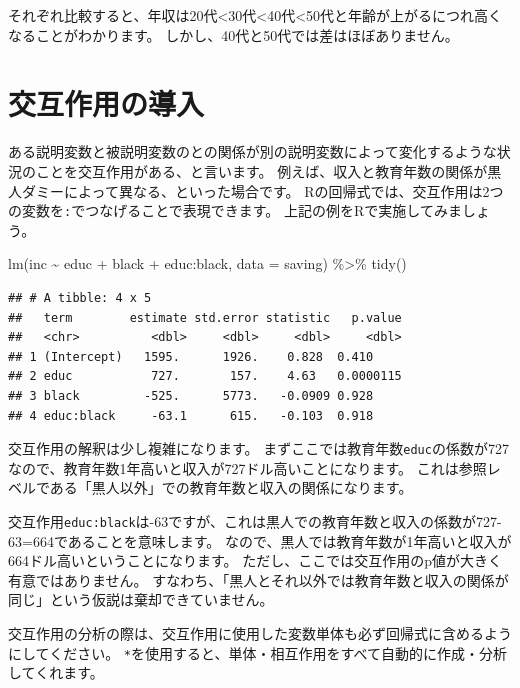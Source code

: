 \documentclass[
]{book}
\newenvironment{Shaded}{\begin{snugshade}}{\end{snugshade}}
\newcommand{\AttributeTok}[1]{\textcolor[rgb]{0.77,0.63,0.00}{#1}}
\newcommand{\FunctionTok}[1]{\textcolor[rgb]{0.00,0.00,0.00}{#1}}
\newcommand{\NormalTok}[1]{#1}
\newcommand{\SpecialCharTok}[1]{\textcolor[rgb]{0.00,0.00,0.00}{#1}}
\begin{document}
それぞれ比較すると、年収は20代\textless30代\textless40代\textless50代と年齢が上がるにつれ高くなることがわかります。
しかし、40代と50代では差はほぼありません。

\hypertarget{ux4ea4ux4e92ux4f5cux7528ux306eux5c0eux5165}{%
\section{交互作用の導入}\label{ux4ea4ux4e92ux4f5cux7528ux306eux5c0eux5165}}

ある説明変数と被説明変数のとの関係が別の説明変数によって変化するような状況のことを交互作用がある、と言います。
例えば、収入と教育年数の関係が黒人ダミーによって異なる、といった場合です。
Rの回帰式では、交互作用は2つの変数を\texttt{:}でつなげることで表現できます。
上記の例をRで実施してみましょう。

\begin{Shaded}
\begin{Highlighting}[]
\FunctionTok{lm}\NormalTok{(inc }\SpecialCharTok{\textasciitilde{}}\NormalTok{ educ }\SpecialCharTok{+}\NormalTok{ black }\SpecialCharTok{+}\NormalTok{ educ}\SpecialCharTok{:}\NormalTok{black, }\AttributeTok{data =}\NormalTok{ saving) }\SpecialCharTok{\%\textgreater{}\%}
  \FunctionTok{tidy}\NormalTok{()}
\end{Highlighting}
\end{Shaded}

\begin{verbatim}
## # A tibble: 4 x 5
##   term        estimate std.error statistic   p.value
##   <chr>          <dbl>     <dbl>     <dbl>     <dbl>
## 1 (Intercept)   1595.      1926.    0.828  0.410    
## 2 educ           727.       157.    4.63   0.0000115
## 3 black         -525.      5773.   -0.0909 0.928    
## 4 educ:black     -63.1      615.   -0.103  0.918
\end{verbatim}

交互作用の解釈は少し複雑になります。
まずここでは教育年数\texttt{educ}の係数が727なので、教育年数1年高いと収入が727ドル高いことになります。
これは参照レベルである「黒人以外」での教育年数と収入の関係になります。

交互作用\texttt{educ:black}は-63ですが、これは黒人での教育年数と収入の係数が727-63=664であることを意味します。
なので、黒人では教育年数が1年高いと収入が664ドル高いということになります。
ただし、ここでは交互作用のp値が大きく有意ではありません。
すなわち、「黒人とそれ以外では教育年数と収入の関係が同じ」という仮説は棄却できていません。

交互作用の分析の際は、交互作用に使用した変数単体も必ず回帰式に含めるようにしてください。
\texttt{*}を使用すると、単体・相互作用をすべて自動的に作成・分析してくれます。
\end{document}
